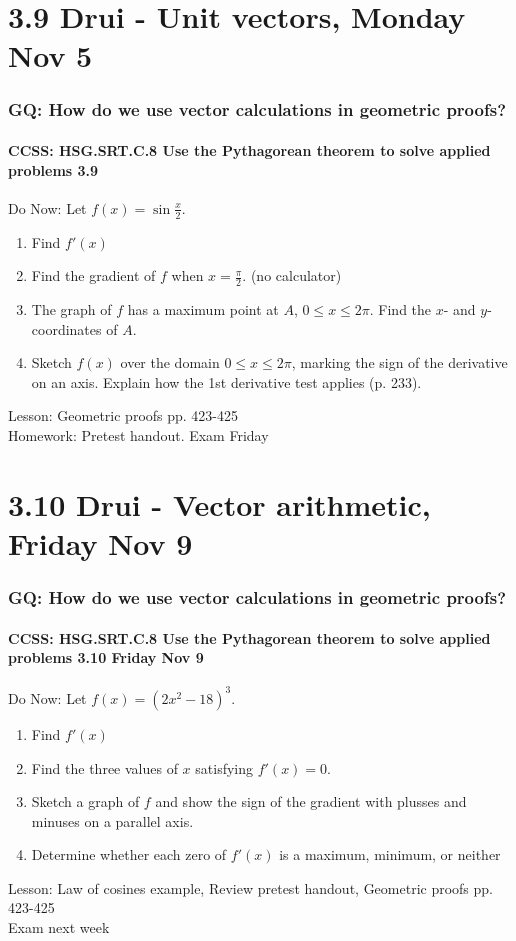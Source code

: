 \documentclass{beamer}
\begin{document}
\section{3.9 Drui - Unit vectors, Monday Nov 5}
  \frame
  {
    \frametitle{GQ: How do we use vector calculations in geometric proofs?}
    \framesubtitle{CCSS: HSG.SRT.C.8 Use the Pythagorean theorem to solve applied problems \qquad \alert{3.9}}
    \begin{block}{Do Now: Let $\displaystyle f(x)= \sin \frac{x}{2}$.}
    \begin{enumerate}
        \item Find $f'(x)$
        \item Find the gradient of $f$ when $x= \frac{\pi}{2}$. (no calculator)
        \item The graph of $f$ has a maximum point at $A$, $0 \leq x \leq 2\pi$. Find the $x$- and $y$-coordinates of $A$.
        \item Sketch $f(x)$ over the domain $0 \leq x \leq 2\pi$, marking the sign of the derivative on an axis. Explain how the 1st derivative test applies (p. 233).
    \end{enumerate}
    \end{block}

    Lesson: Geometric proofs pp. 423-425\\ \bigskip
    Homework: Pretest handout. \alert{Exam Friday}
  }

\section{3.10 Drui - Vector arithmetic, Friday Nov 9}
  \frame
  {
    \frametitle{GQ: How do we use vector calculations in geometric proofs?}
    \framesubtitle{CCSS: HSG.SRT.C.8 Use the Pythagorean theorem to solve applied problems \qquad \alert{3.10 Friday Nov 9}}

    \begin{block}{Do Now: Let $f(x)= (2x^2-18)^3$.}
    \begin{enumerate}
        \item Find $f'(x)$
        \item Find the three values of $x$ satisfying $f'(x)=0$.
        \item Sketch a graph of $f$ and show the sign of the gradient with plusses and minuses on a parallel axis.
        \item Determine whether each zero of $f'(x)$ is a maximum, minimum, or neither
    \end{enumerate}
    \end{block}

    Lesson: Law of cosines example, Review pretest handout, Geometric proofs pp. 423-425\\ \bigskip
    \alert{Exam next week}
  }
\end{document}
